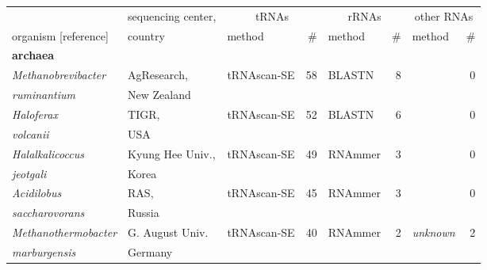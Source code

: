 \begin{footnotesize}
\begin{table}
\label{tbl:genomes}       
\begin{center}
\begin{tabular}{|ll|lr|lr|lr|}
\hline
                                         & sequencing center,&\multicolumn{2}{c|}{tRNAs}&\multicolumn{2}{c|}{rRNAs}& \multicolumn{2}{c|}{other RNAs} \\ \cline{3-8}
organism [reference]                     & country           & method        & \#       & method         & \# & method & \# \\ \hline
\multicolumn{8}{l}{\textbf{archaea}} \\ \hline
\emph{Methanobrevibacter}                & AgResearch,       & tRNAscan-SE   & 58       & BLASTN         & 8  &                & 0        \\
\emph{ruminantium}                       & New Zealand       &               &          &                &    &                &          \\ \hline
\emph{Haloferax}                         & TIGR,             & tRNAscan-SE   & 52       & BLASTN         & 6  &                & 0        \\
\emph{volcanii}                          & USA               &               &          &                &    &                &          \\  \hline %
\emph{Halalkalicoccus}                   & Kyung Hee Univ.,  & tRNAscan-SE   & 49       & RNAmmer        & 3  &                & 0        \\
\emph{jeotgali}                          & Korea             &               &          &                &    &                &          \\ \hline
\emph{Acidilobus}                        & RAS,              & tRNAscan-SE   & 45       & RNAmmer        & 3  &                & 0        \\
\emph{saccharovorans}                    & Russia            &               &          &                &    &                &          \\ \hline
\emph{Methanothermobacter}               & G. August Univ.   & tRNAscan-SE   & 40       & RNAmmer        & 2  & \emph{unknown} &  2       \\
\emph{marburgensis}                      & Germany           &               &          &                &    &                &          \\ \hline %

\end{tabular}
\end{center}
\end{table}
\end{footnotesize}
